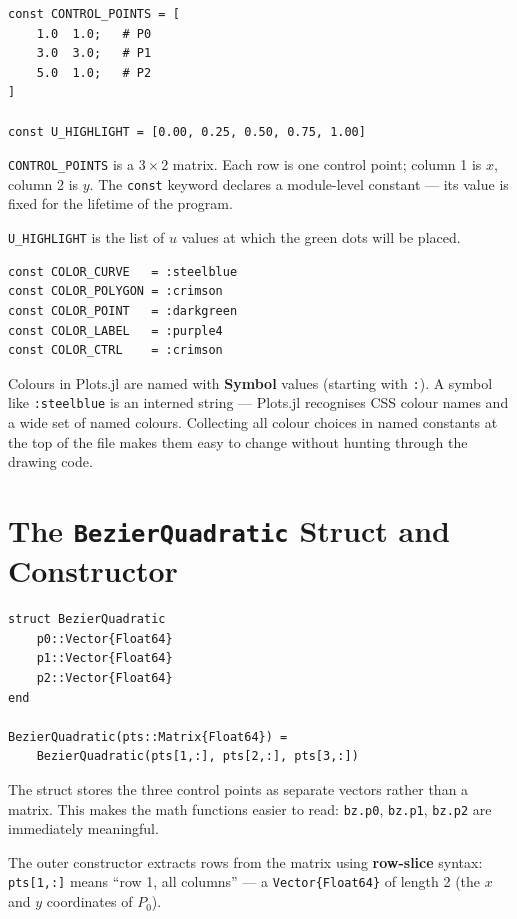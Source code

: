 \documentclass[12pt, a4paper]{article}
\newcommand{\cd}[1]{\texttt{#1}}
\begin{document}
\begin{verbatim}
const CONTROL_POINTS = [
    1.0  1.0;   # P0
    3.0  3.0;   # P1
    5.0  1.0;   # P2
]

const U_HIGHLIGHT = [0.00, 0.25, 0.50, 0.75, 1.00]
\end{verbatim}

\cd{CONTROL\_POINTS} is a $3 \times 2$ matrix.
Each row is one control point; column 1 is $x$,
column 2 is $y$.
The \cd{const} keyword declares a module-level constant ---
its value is fixed for the lifetime of the program.

\cd{U\_HIGHLIGHT} is the list of $u$ values at which the
green dots will be placed.

\begin{verbatim}
const COLOR_CURVE   = :steelblue
const COLOR_POLYGON = :crimson
const COLOR_POINT   = :darkgreen
const COLOR_LABEL   = :purple4
const COLOR_CTRL    = :crimson
\end{verbatim}

Colours in Plots.jl are named with \textbf{Symbol} values
(starting with \cd{:}).
A symbol like \cd{:steelblue} is an interned string ---
Plots.jl recognises CSS colour names and a wide set of
named colours.
Collecting all colour choices in named constants at the
top of the file makes them easy to change without hunting
through the drawing code.


\section{The \texttt{BezierQuadratic} Struct and Constructor}

\begin{verbatim}
struct BezierQuadratic
    p0::Vector{Float64}
    p1::Vector{Float64}
    p2::Vector{Float64}
end

BezierQuadratic(pts::Matrix{Float64}) =
    BezierQuadratic(pts[1,:], pts[2,:], pts[3,:])
\end{verbatim}

The struct stores the three control points as separate
vectors rather than a matrix.
This makes the math functions easier to read: \cd{bz.p0},
\cd{bz.p1}, \cd{bz.p2} are immediately meaningful.

The outer constructor extracts rows from the matrix using
\textbf{row-slice} syntax: \cd{pts[1,:]} means
``row 1, all columns'' --- a \cd{Vector\{Float64\}} of
length 2 (the $x$ and $y$ coordinates of $P_0$).
\end{document}
